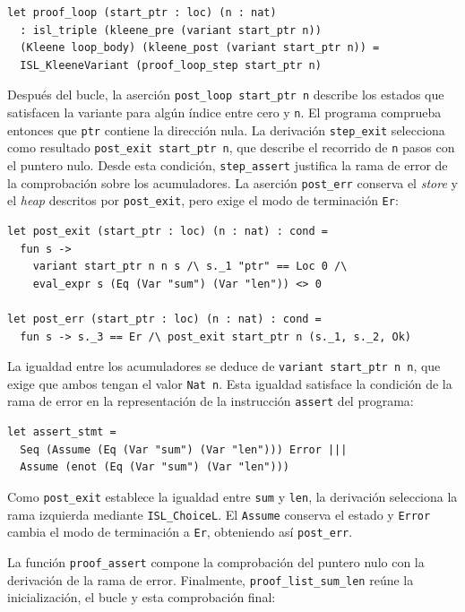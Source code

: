 \documentclass[a4paper,	11pt]{report}
\begin{document}
\begin{lstlisting}
let proof_loop (start_ptr : loc) (n : nat)
  : isl_triple (kleene_pre (variant start_ptr n))
  (Kleene loop_body) (kleene_post (variant start_ptr n)) =
  ISL_KleeneVariant (proof_loop_step start_ptr n)
\end{lstlisting}

Después del bucle,
la aserción \lstinline|post_loop start_ptr n| describe los estados que satisfacen la variante para algún índice entre cero y \lstinline|n|.
El programa comprueba entonces que \lstinline|ptr| contiene la dirección nula.
La derivación \lstinline|step_exit| selecciona como resultado \lstinline|post_exit start_ptr n|,
que describe el recorrido de \lstinline|n| pasos con el puntero nulo.
Desde esta condición,
\lstinline|step_assert| justifica la rama de error de la comprobación sobre los acumuladores.
La aserción \lstinline|post_err| conserva el \emph{store} y el \emph{heap} descritos por \lstinline|post_exit|,
pero exige el modo de terminación \lstinline|Er|:

\begin{lstlisting}
let post_exit (start_ptr : loc) (n : nat) : cond =
  fun s ->
    variant start_ptr n n s /\ s._1 "ptr" == Loc 0 /\
    eval_expr s (Eq (Var "sum") (Var "len")) <> 0

let post_err (start_ptr : loc) (n : nat) : cond =
  fun s -> s._3 == Er /\ post_exit start_ptr n (s._1, s._2, Ok)
\end{lstlisting}
La igualdad entre los acumuladores se deduce de \lstinline|variant start_ptr n n|,
que exige que ambos tengan el valor \lstinline|Nat n|.
Esta igualdad satisface la condición de la rama de error en la representación de la instrucción \lstinline|assert| del programa:

\begin{lstlisting}
let assert_stmt =
  Seq (Assume (Eq (Var "sum") (Var "len"))) Error |||
  Assume (enot (Eq (Var "sum") (Var "len")))
\end{lstlisting}

Como \lstinline|post_exit| establece la igualdad entre \lstinline|sum| y \lstinline|len|,
la derivación selecciona la rama izquierda mediante \lstinline|ISL_ChoiceL|.
El \lstinline|Assume| conserva el estado y \lstinline|Error| cambia el modo de terminación a \lstinline|Er|,
obteniendo así \lstinline|post_err|.

La función \lstinline|proof_assert| compone la comprobación del puntero nulo con la derivación de la rama de error.
Finalmente,
\lstinline|proof_list_sum_len| reúne la inicialización,
el bucle y esta comprobación final:
\end{document}
